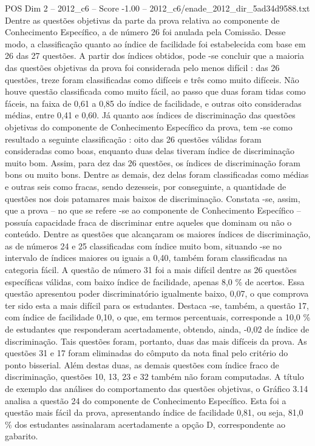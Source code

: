 \begin{textsample}{POS Dim 2 – 2012\_c6 – Score -1.00 – 2012\_c6/enade\_2012\_dir\_5ad34d9588.txt}
Dentre as questões objetivas da parte da prova relativa ao componente de Conhecimento Específico, a de número 26 foi anulada pela Comissão.
Desse modo, a classificação quanto ao índice de facilidade foi estabelecida com base em 26 das 27 questões.
A partir dos índices obtidos, pode -se concluir que a maioria das questões objetivas da prova foi considerada pelo menos difícil : das 26 questões, treze foram classificadas como difíceis e três como muito difíceis.
Não houve questão classificada como muito fácil, ao passo que duas foram tidas como fáceis, na faixa de 0,61 a 0,85 do índice de facilidade, e outras oito consideradas médias, entre 0,41 e 0,60.
Já quanto aos índices de discriminação das questões objetivas do componente de Conhecimento Específico da prova, tem -se como resultado a seguinte classificação : oito das 26 questões válidas foram consideradas como boas, enquanto duas delas tiveram índice de discriminação muito bom.
Assim, para dez das 26 questões, os índices de discriminação foram bons ou muito bons.
Dentre as demais, dez delas foram classificadas como médias e outras seis como fracas, sendo dezesseis, por conseguinte, a quantidade de questões nos dois patamares mais baixos de discriminação.
Constata -se, assim, que a prova – no que se refere -se ao componente de Conhecimento Específico – possuía capacidade fraca de discriminar entre aqueles que dominam ou não o conteúdo.
Dentre as questões que alcançaram os maiores índices de discriminação, as de números 24 e 25 classificadas com índice muito bom, situando -se no intervalo de índices maiores ou iguais a 0,40, também foram classificadas na categoria fácil.
A questão de número 31 foi a mais difícil dentre as 26 questões específicas válidas, com baixo índice de facilidade, apenas 8,0 \% de acertos.
Essa questão apresentou poder discriminatório igualmente baixo, 0,07, o que comprova ter sido esta a mais difícil para os estudantes.
Destaca -se, também, a questão 17, com índice de facilidade 0,10, o que, em termos percentuais, corresponde a 10,0 \% de estudantes que responderam acertadamente, obtendo, ainda, -0,02 de índice de discriminação.
Tais questões foram, portanto, duas das mais difíceis da prova.
As questões 31 e 17 foram eliminadas do cômputo da nota final pelo critério do ponto bisserial.
Além destas duas, as demais questões com índice fraco de discriminação, questões 10, 13, 23 e 32 também não foram computadas.
A título de exemplo das análises do comportamento das questões objetivas, o Gráfico 3.14 analisa a questão 24 do componente de Conhecimento Específico.
Esta foi a questão mais fácil da prova, apresentando índice de facilidade 0,81, ou seja, 81,0 \% dos estudantes assinalaram acertadamente a opção D, correspondente ao gabarito.

\end{textsample}
